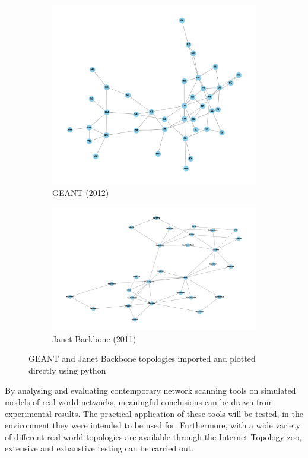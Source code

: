\begin{figure}
\centering
\begin{subfigure}{.5\textwidth}
    \centering
    \includegraphics[width=0.7\linewidth]{images/real-world/geant_plot.png}
    \caption{GEANT (2012) \cite{topology_zoo}}
    \label{fig:GEANT_plot}
\end{subfigure}%
\begin{subfigure}{.5\textwidth}
    \centering
    \includegraphics[width=0.7\linewidth]{images/real-world/janet_plot.png}
    \caption{Janet Backbone (2011) \cite{topology_zoo}}
    \label{fig:janet_backbone_plot}
\end{subfigure}
\caption{GEANT and Janet Backbone topologies imported and plotted directly using python}
\label{fig:test}
\end{figure}

By analysing and evaluating contemporary network scanning tools on simulated models of real-world networks, meaningful conclusions can be drawn from experimental results. The practical application of these tools will be tested, in the  environment they were intended to be used for. Furthermore, with a wide variety of different real-world topologies are available through the Internet Topology zoo, extensive and exhaustive testing can be carried out. 

